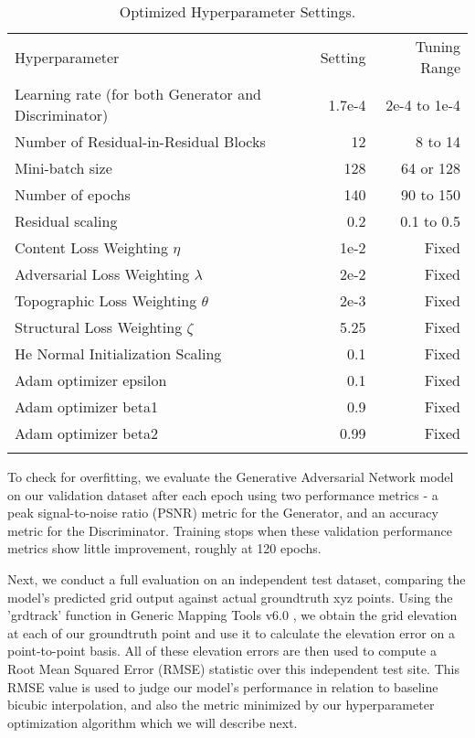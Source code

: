 \documentclass[tc, manuscript]{copernicus}
\begin{document}
\begin{table*}[ht]
  \caption{Optimized Hyperparameter Settings.}
  \label{table:B1}
  \begin{tabular}{lrr}
  \tophline
  Hyperparameter & Setting & Tuning Range \\
  \middlehline
  Learning rate (for both Generator and Discriminator) & 1.7e-4 & 2e-4 to 1e-4 \\
  Number of Residual-in-Residual Blocks & 12 & 8 to 14 \\
  Mini-batch size & 128 & 64 or 128 \\
  Number of epochs & 140 & 90 to 150 \\
  Residual scaling & 0.2 & 0.1 to 0.5 \\
  Content Loss Weighting $\eta$ & 1e-2 & Fixed \\
  Adversarial Loss Weighting $\lambda$ & 2e-2 & Fixed \\
  Topographic Loss Weighting $\theta$ & 2e-3 & Fixed \\
  Structural Loss Weighting $\zeta$ & 5.25 & Fixed \\
  He Normal Initialization Scaling & 0.1 & Fixed \\
  Adam optimizer epsilon & 0.1 & Fixed \\
  Adam optimizer beta1 & 0.9 & Fixed \\
  Adam optimizer beta2 & 0.99 & Fixed \\
  \bottomhline
  \end{tabular}
  \belowtable{} %
\end{table*}

To check for overfitting, we evaluate the Generative Adversarial Network model on our validation dataset after each epoch using two performance metrics - a peak signal-to-noise ratio (PSNR) metric for the Generator, and an accuracy metric for the Discriminator.
Training stops when these validation performance metrics show little improvement, roughly at 120 epochs.

Next, we conduct a full evaluation on an independent test dataset, comparing the model's predicted grid output against actual groundtruth xyz points.
Using the 'grdtrack' function in Generic Mapping Tools v6.0 \citep{WesselGenericMappingTools2019}, we obtain the grid elevation at each of our groundtruth point and use it to calculate the elevation error on a point-to-point basis.
All of these elevation errors are then used to compute a Root Mean Squared Error (RMSE) statistic over this independent test site.
This RMSE value is used to judge our model's performance in relation to baseline bicubic interpolation, and also the metric minimized by our hyperparameter optimization algorithm which we will describe next.
\end{document}
